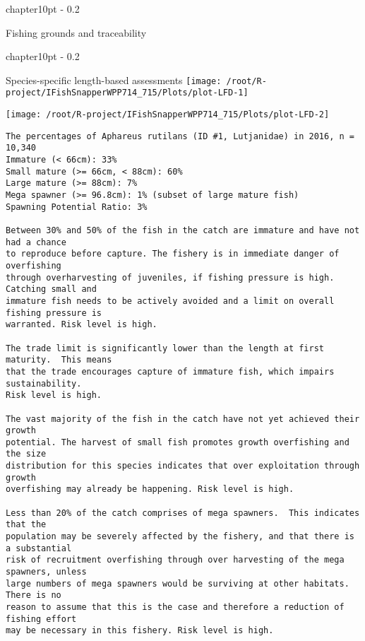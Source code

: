 \documentclass{report}\usepackage[]{graphicx}\usepackage[]{color}
\makeatletter
\def\maxwidth{ %
  \ifdim\Gin@nat@width>\linewidth
    \linewidth
  \else
    \Gin@nat@width
  \fi
}
\newenvironment{kframe}{%
 \def\at@end@of@kframe{}%
 \ifinner\ifhmode%
  \def\at@end@of@kframe{\end{minipage}}%
  \begin{minipage}{\columnwidth}%
 \fi\fi%
 \def\FrameCommand##1{\hskip\@totalleftmargin \hskip-\fboxsep
 \colorbox{shadecolor}{##1}\hskip-\fboxsep
     \hskip-\linewidth \hskip-\@totalleftmargin \hskip\columnwidth}%
 \MakeFramed {\advance\hsize-\width
   \@totalleftmargin\z@ \linewidth\hsize
   \@setminipage}}%
 {\par\unskip\endMakeFramed%
 \at@end@of@kframe}
\newenvironment{knitrout}{}{} %
\newcommand{\verbatimfont}[1]{\def\verbatim@font{#1}}%
\renewcommand\chapter{\@startsection%
{chapter}{1}{0pt}%
{-\baselineskip}%
{0.2\baselineskip}%
{\raggedright\bf}}%
\makeatother
\begin{document}
\newpage

\chapter{Fishing grounds and traceability}


\newpage

\chapter{Species-specific length-based assessments}
\verbatimfont{\normalfont\rmfamily}
\begin{knitrout}
\color{fgcolor}
\texttt{[image: /root/R-project/IFishSnapperWPP714\_715/Plots/plot-LFD-1]} 

\texttt{[image: /root/R-project/IFishSnapperWPP714\_715/Plots/plot-LFD-2]} 
\begin{kframe}\begin{verbatim}
The percentages of Aphareus rutilans (ID #1, Lutjanidae) in 2016, n = 10,340
Immature (< 66cm): 33%
Small mature (>= 66cm, < 88cm): 60%
Large mature (>= 88cm): 7%
Mega spawner (>= 96.8cm): 1% (subset of large mature fish)
Spawning Potential Ratio: 3%
 
Between 30% and 50% of the fish in the catch are immature and have not had a chance
to reproduce before capture. The fishery is in immediate danger of overfishing
through overharvesting of juveniles, if fishing pressure is high.  Catching small and
immature fish needs to be actively avoided and a limit on overall fishing pressure is
warranted. Risk level is high.

The trade limit is significantly lower than the length at first maturity.  This means
that the trade encourages capture of immature fish, which impairs sustainability.
Risk level is high.

The vast majority of the fish in the catch have not yet achieved their growth
potential. The harvest of small fish promotes growth overfishing and the size
distribution for this species indicates that over exploitation through growth
overfishing may already be happening. Risk level is high.

Less than 20% of the catch comprises of mega spawners.  This indicates that the
population may be severely affected by the fishery, and that there is a substantial
risk of recruitment overfishing through over harvesting of the mega spawners, unless
large numbers of mega spawners would be surviving at other habitats. There is no
reason to assume that this is the case and therefore a reduction of fishing effort
may be necessary in this fishery. Risk level is high.
 

\end{verbatim}
\end{kframe}
\end{knitrout}
\end{document}
